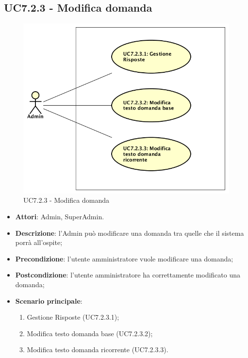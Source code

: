 \documentclass[../AnalisiDeiRequisiti_v3.0.0.tex]{subfiles}
\begin{document}
\subsection{UC7.2.3 - Modifica domanda} 
\label{sssec:UC7.2.3} 
\begin{figure}[!h]
	\centering
	\includegraphics[scale=0.7]{UseCases/UC7_GestionePannelloAdmin/UC7_2_GestioneDomande/UC7_2_3_ModificaDomanda/UC7_2_3_ModificaDomanda.png}
	\caption{UC7.2.3 - Modifica domanda}
\end{figure}
\begin{itemize} 
\item \textbf{Attori}: Admin, SuperAdmin.
\item \textbf{Descrizione}: l'Admin può modificare una domanda tra quelle che il sistema porrà all'ospite;
\item \textbf{Precondizione}: l'utente amministratore vuole modificare una domanda;
\item \textbf{Postcondizione}: l'utente amministratore ha correttamente modificato una domanda;
\item \textbf{Scenario principale}: \begin{enumerate}\item Gestione Risposte (UC7.2.3.1);\item Modifica testo domanda base (UC7.2.3.2);\item Modifica testo domanda ricorrente (UC7.2.3.3).
\end{enumerate}
\end{itemize} 
\newpage
\end{document}
